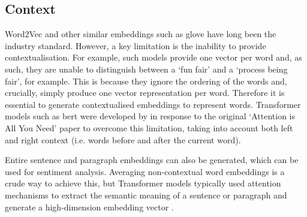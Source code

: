 \subsection{Context}\label{sec:embeddings_context}
Word2Vec and other similar embeddings such as \acrshort{glove} \citep{Pennington} have long been the industry standard. However, a key limitation is the inability to provide contextualisation. For example, such models provide one vector per word and, as such, they are unable to distinguish between a `fun fair' and a `process being fair', for example. This is because they ignore the ordering of the words and, crucially, simply produce one vector representation per word. Therefore it is essential to generate contextualised embeddings to represent words. Transformer models such as \acrfull{bert} were developed by \citet{devlin2019bert} in response to the original `Attention is All You Need' paper \citep{vaswani2017attention} to overcome this limitation, taking into account both left and right context (i.e. words before and after the current word).

Entire sentence and paragraph embeddings can also be generated, which can be used for sentiment analysis. Averaging non-contextual word embeddings is a crude way to achieve this, but Transformer models typically used attention mechanisms to extract the semantic meaning of a sentence or paragraph and generate a high-dimension embedding vector \citep{langchain}.





